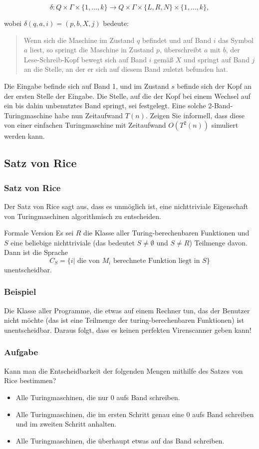 \documentclass{beamer}
\begin{document}
{\begin{frame}
\[ \delta: Q \times \Gamma \times \{1, \ldots, k\} \to
Q \times \Gamma \times \{L, R, N\} \times \{1, \ldots, k\}, \]

wobei $\delta(q, a, i) = (p, b, X, j)$ bedeute:

\begin{quote}
  Wenn sich die Maschine im Zustand $q$ befindet und
  auf Band $i$ das Symbol $a$ liest, so springt die Maschine in Zustand $p$,
  überschreibt $a$ mit $b$, der Lese-Schreib-Kopf bewegt sich auf Band $i$
  gemäß $X$ und springt auf Band $j$ an die Stelle, an der er sich
  auf diesem Band zuletzt befunden hat.
\end{quote}

Die Eingabe befinde sich auf Band 1, und im Zustand $s$ befinde sich der
Kopf an der ersten Stelle der Eingabe. Die Stelle, auf die der Kopf bei einem
Wechsel auf ein bis dahin unbenutztes Band springt, sei
festgelegt.
Eine solche 2-Band-Turingmaschine habe nun Zeitaufwand $T(n)$.
Zeigen Sie informell, dass diese von einer einfachen
Turingmaschine mit Zeitaufwand $O(T^2(n))$ simuliert werden kann.\\
\end{frame}

\subsection{Satz von Rice}
\begin{frame}
\frametitle{Satz von Rice}
Der Satz von Rice sagt aus, dass es unmöglich ist, eine nichttriviale Eigenschaft von Turingmaschinen algorithmisch zu entscheiden.
\begin{block}{Formale Version}
Es sei $R$ die Klasse aller Turing-berechenbaren Funktionen und $S$ eine beliebige nichttriviale (das bedeutet $S \neq \emptyset$ und $S \neq R$) Teilmenge davon. Dann ist die Sprache
$$ C_S = \{ i |\text{ die von $M_i$ berechnete Funktion liegt in $S$} \} $$
unentscheidbar. 
\end{block}
\end{frame}
\begin{frame}
\frametitle{Beispiel}
Die Klasse aller Programme, die etwas auf einem Rechner tun, das der Benutzer nicht möchte (das ist eine Teilmenge der turing-berechenbaren Funktionen) ist unentscheidbar. Daraus folgt, dass es keinen perfekten Virenscanner geben kann!
\end{frame}

\begin{frame}
\frametitle{Aufgabe}
Kann man die Entscheidbarkeit der folgenden Mengen mithilfe des Satzes von Rice bestimmen?
\begin{itemize}
\item Alle Turingmaschinen, die nur $0$ aufs Band schreiben.
\item Alle Turingmaschinen, die im ersten Schritt genau eine $0$ aufs Band schreiben und im zweiten Schritt anhalten. 
\item Alle Turingmaschinen, die überhaupt etwas auf das Band schreiben.
\end{itemize}
\end{frame}

}
\end{document}
